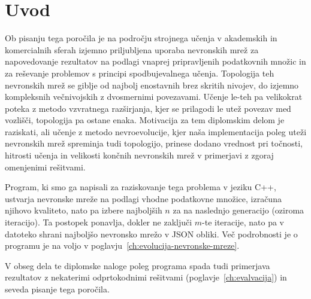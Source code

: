 \documentclass[a4paper,12pt,openright]{book}
\begin{document}
    \chapter{Uvod}\label{ch:uvod}
    Ob pisanju tega poročila je na področju strojnega učenja v akademskih in komercialnih sferah izjemno priljubljena
    uporaba nevronskih mrež za napovedovanje rezultatov na podlagi vnaprej pripravljenih podatkovnih množic in za reševanje
    problemov s principi spodbujevalnega učenja.
    Topologija teh nevronskih mrež se giblje od najbolj enostavnih brez skritih nivojev, do izjemno kompleksnih večnivojskih
    z dvosmernimi povezavami.
    Učenje le-teh pa velikokrat poteka z metodo vzvratnega razširjanja, kjer se prilagodi le utež povezav med vozlišči,
    topologija pa ostane enaka.
    Motivacija za tem diplomskim delom je raziskati, ali učenje z metodo nevroevolucije, kjer naša implementacija poleg uteži nevronskih
    mrež spreminja tudi topologijo, prinese dodano vrednost pri točnosti, hitrosti učenja in velikosti končnih nevronskih
    mrež v primerjavi z zgoraj omenjenimi rešitvami.

    Program, ki smo ga napisali za raziskovanje tega problema v jeziku C++, ustvarja nevronske mreže na podlagi vhodne
    podatkovne množice, izračuna njihovo kvaliteto, nato pa izbere najboljših $n$ za na naslednjo generacijo (oziroma iteracijo).
    Ta postopek ponavlja, dokler ne zaključi $m$-te iteracije, nato pa v datoteko shrani najboljšo nevronsko mrežo v JSON obliki.
    Več podrobnosti je o programu je na voljo v poglavju~\ref{ch:evolucija-nevronske-mreze}.

    V obseg dela te diplomske naloge poleg programa spada tudi primerjava rezultatov z nekaterimi odprtokodnimi rešitvami (poglavje~\ref{ch:evalvacija})
    in seveda pisanje tega poročila.
\end{document}
